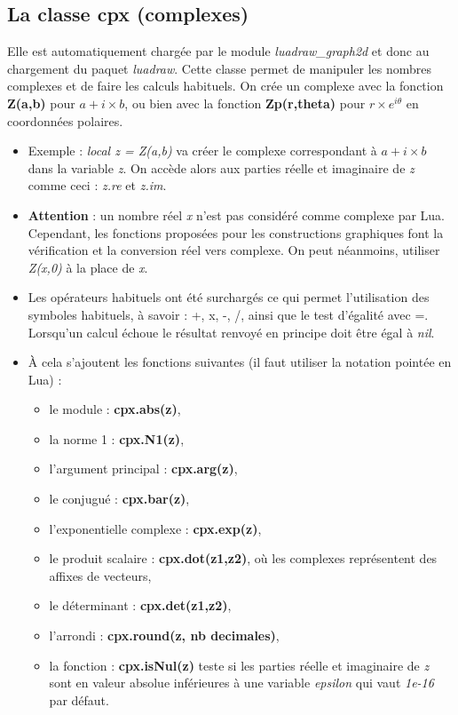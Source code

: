 \documentclass[%
10pt,%
a4paper,%
french,%
]%
{article}%
\begin{document}
\subsection{La classe cpx (complexes)}

Elle est automatiquement chargée par le module \emph{luadraw\_graph2d} et donc au chargement du paquet \emph{luadraw}. Cette classe permet de manipuler les nombres complexes et de faire les calculs habituels. On crée un complexe avec la fonction \textbf{Z(a,b)} pour \(a+i\times b\), ou bien avec la fonction \textbf{Zp(r,theta)} pour \(r\times e^{i\theta}\) en coordonnées polaires.

\begin{itemize}
\item Exemple : \emph{local z = Z(a,b)} va créer le complexe correspondant à \(a+i\times b\) dans la variable \emph{z}. On accède alors aux parties réelle et imaginaire de \emph{z} comme ceci : \emph{z.re} et \emph{z.im}.
\item \textbf{Attention} : un nombre réel \emph{x} n'est pas considéré comme complexe par Lua. Cependant, les fonctions proposées pour les constructions graphiques font la vérification et la conversion réel vers complexe. On peut néanmoins, utiliser \emph{Z(x,0)} à la place de \emph{x}.
\item Les opérateurs habituels ont été surchargés ce qui permet l'utilisation des symboles habituels, à savoir : +, x, -, /, ainsi que le test d'égalité avec =. Lorsqu'un calcul échoue le résultat renvoyé en principe doit être égal à \emph{nil}.
\item À cela s'ajoutent les fonctions suivantes (il faut utiliser la notation pointée en Lua) :
  \begin{itemize}
  \item le module : \textbf{cpx.abs(z)},
  \item la norme 1 : \textbf{cpx.N1(z)},
  \item l'argument principal : \textbf{cpx.arg(z)},
  \item le conjugué : \textbf{cpx.bar(z)},
  \item l'exponentielle complexe : \textbf{cpx.exp(z)},
  \item le produit scalaire : \textbf{cpx.dot(z1,z2)}, où les complexes représentent des affixes de vecteurs,
  \item le déterminant : \textbf{cpx.det(z1,z2)},
  \item l'arrondi : \textbf{cpx.round(z, nb decimales)},
  \item la fonction : \textbf{cpx.isNul(z)} teste si les parties réelle et imaginaire de \emph{z} sont en valeur absolue inférieures à une variable \emph{epsilon} qui vaut \emph{1e-16} par défaut.
  \end{itemize}
\end{itemize}
\end{document}
